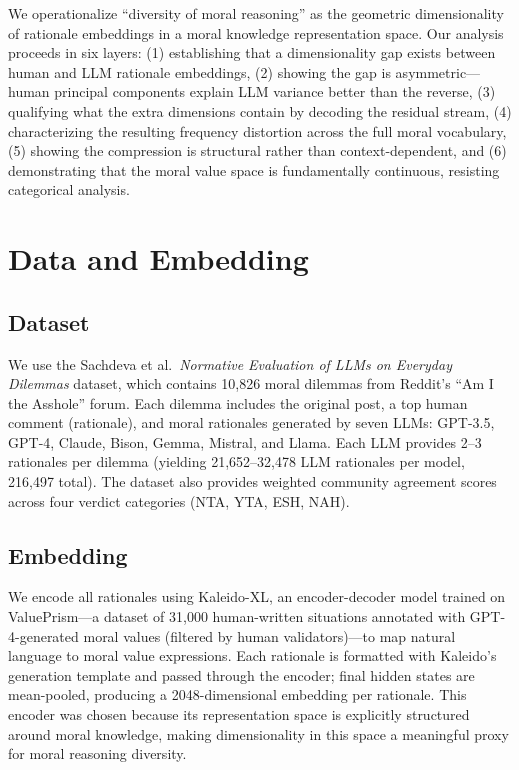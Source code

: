 \documentclass[11pt,a4paper]{article}
\begin{document}
We operationalize ``diversity of moral reasoning'' as the geometric dimensionality of rationale embeddings in a moral knowledge representation space. Our analysis proceeds in six layers: (1) establishing that a dimensionality gap exists between human and LLM rationale embeddings, (2) showing the gap is asymmetric---human principal components explain LLM variance better than the reverse, (3) qualifying what the extra dimensions contain by decoding the residual stream, (4) characterizing the resulting frequency distortion across the full moral vocabulary, (5) showing the compression is structural rather than context-dependent, and (6) demonstrating that the moral value space is fundamentally continuous, resisting categorical analysis.

\section{Data and Embedding}

\subsection{Dataset}

We use the Sachdeva et al.\ \emph{Normative Evaluation of LLMs on Everyday Dilemmas} dataset, which contains 10,826 moral dilemmas from Reddit's ``Am I the Asshole'' forum. Each dilemma includes the original post, a top human comment (rationale), and moral rationales generated by seven LLMs: GPT-3.5, GPT-4, Claude, Bison, Gemma, Mistral, and Llama. Each LLM provides 2--3 rationales per dilemma (yielding 21,652--32,478 LLM rationales per model, 216,497 total). The dataset also provides weighted community agreement scores across four verdict categories (NTA, YTA, ESH, NAH).

\subsection{Embedding}

We encode all rationales using Kaleido-XL, an encoder-decoder model trained on ValuePrism---a dataset of 31,000 human-written situations annotated with GPT-4-generated moral values (filtered by human validators)---to map natural language to moral value expressions. Each rationale is formatted with Kaleido's generation template and passed through the encoder; final hidden states are mean-pooled, producing a 2048-dimensional embedding per rationale. This encoder was chosen because its representation space is explicitly structured around moral knowledge, making dimensionality in this space a meaningful proxy for moral reasoning diversity.
\end{document}
